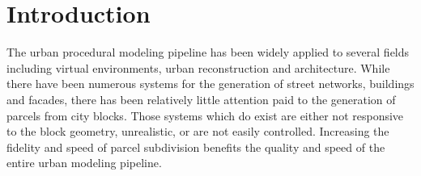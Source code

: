
\section{Introduction}
\label{sec:parcelIntroduction}

The urban procedural modeling pipeline has been widely applied to several fields including virtual environments, urban reconstruction and architecture.
While there have been numerous systems for the generation of street networks\cite{Chen08}, buildings\cite{Pascal06} and facades\cite{Mueller:2007:IBP}, there has been relatively little attention paid to the generation of parcels from city blocks. Those systems which do exist are either not responsive to the block geometry, unrealistic, or are not easily controlled. Increasing the fidelity and speed of parcel subdivision benefits the quality and speed of the entire urban modeling pipeline.

